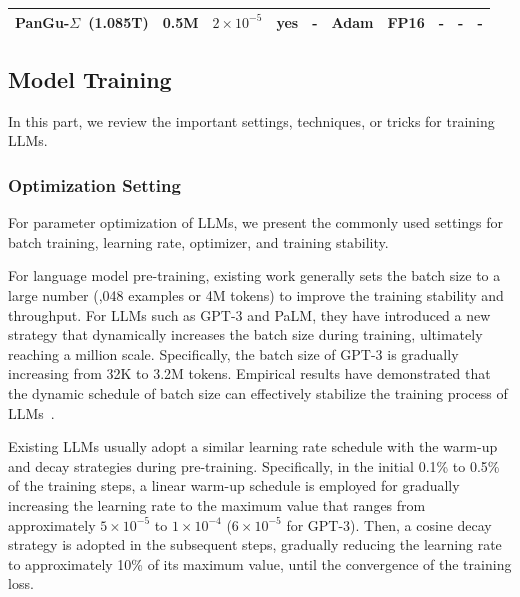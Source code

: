 {\begin{table}[htb]
{\begin{tabular}{lrrccccccc}
PanGu-$\Sigma$~(1.085T) & 0.5M                                                                              & $2 \times 10^{-5}$                                                          & yes             & -                       & Adam                                            & FP16                                                                       & -                                                                                       & -                                                                     & -                \\
\bottomrule\end{tabular}
}
\end{table}

\subsection{Model Training}
\label{sec:training_settings}
In this part, we review the important settings, techniques, or tricks for training LLMs. 

\subsubsection{Optimization Setting}
 For parameter optimization of LLMs, we present the commonly used settings for batch training, learning rate, optimizer, and training stability.

For language model pre-training, existing work generally sets the batch size to a large number (,048 examples or 4M tokens) to improve the training stability and {throughput}.
For LLMs such as GPT-3 and PaLM, they have introduced  a new strategy that dynamically increases the batch size during training, ultimately reaching a million scale. 
Specifically, the batch size of GPT-3 is gradually increasing from 32K to 3.2M tokens.
Empirical results have demonstrated that the dynamic  schedule of batch size can effectively stabilize the training process of LLMs~\cite{Chowdhery-arxiv-2022-PaLM}.

Existing LLMs usually adopt a similar learning rate schedule with the warm-up and decay strategies during pre-training.
Specifically, in the initial 0.1\% to 0.5\% of the training steps, a linear warm-up schedule is employed for gradually increasing the learning rate to the maximum value that ranges from approximately $5 \times 10^{-5}$ to $1 \times 10^{-4}$ (\eg $6 \times 10^{-5}$ for GPT-3).
Then, a cosine decay strategy is adopted in the subsequent steps,  gradually reducing the learning rate to approximately 10\% of its maximum value, until the convergence of the training loss.

}
